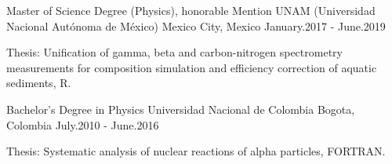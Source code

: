 

\begin{cventries}

  \cventry
    {Master of Science Degree (Physics), honorable Mention} %
    {UNAM (Universidad Nacional Autónoma de México)} %
    {Mexico City,  Mexico} %
    {January.2017 - June.2019} %
    {
      \begin{cvitems} %
        \item {Thesis: Unification of gamma, beta and carbon-nitrogen spectrometry measurements for composition simulation and efficiency correction of aquatic sediments, R. }
      \end{cvitems}
    }
  \cventry
    {Bachelor's Degree in Physics} %
    {Universidad Nacional de Colombia} %
    {Bogota,  Colombia} %
    {July.2010 - June.2016} %
    {
      \begin{cvitems} %
        \item {Thesis: Systematic analysis of nuclear reactions of alpha particles, FORTRAN.}
      \end{cvitems}
    }
\end{cventries}

